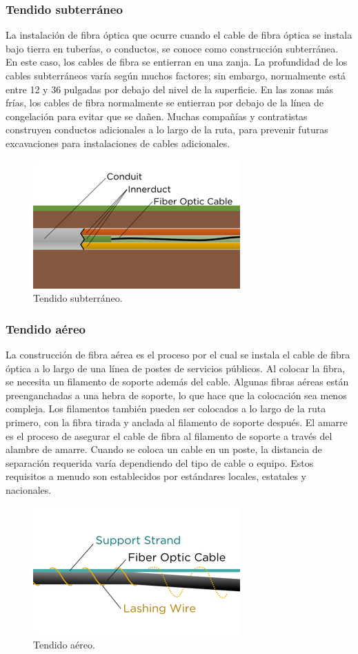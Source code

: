 \documentclass[12pt,letterpaper]{article}
\begin{document}
\subsubsection{Tendido subterráneo}
La instalación de fibra óptica que ocurre cuando el cable de fibra óptica se instala bajo 
tierra en tuberías, o conductos, se conoce como construcción subterránea. En este caso, los 
cables de fibra se entierran en una zanja. La profundidad de los cables subterráneos varía 
según muchos factores; sin embargo, normalmente está entre 12 y 36 pulgadas por debajo del 
nivel de la superficie. En las zonas más frías, los cables de fibra normalmente se entierran 
por debajo de la línea de congelación para evitar que se dañen. Muchas compañías y 
contratistas construyen conductos adicionales a lo largo de la ruta, para prevenir futuras 
excavaciones para instalaciones de cables adicionales.
\begin{figure}[ht]
    \centering
    \includegraphics[width=.5\textwidth]{f11.png}
    \caption{Tendido subterráneo.}
\end{figure}

\subsubsection{Tendido aéreo}
La construcción de fibra aérea es el proceso por el cual se instala el cable de fibra 
óptica a lo largo de una línea de postes de servicios públicos. Al colocar la fibra, se 
necesita un filamento de soporte además del cable. Algunas fibras aéreas están 
preenganchadas a una hebra de soporte, lo que hace que la colocación sea menos compleja. 
Los filamentos también pueden ser colocados a lo largo de la ruta primero, con la fibra 
tirada y anclada al filamento de soporte después. El amarre es el proceso de asegurar el 
cable de fibra al filamento de soporte a través del alambre de amarre. Cuando se coloca 
un cable en un poste, la distancia de separación requerida varía dependiendo del tipo de 
cable o equipo. Estos requisitos a menudo son establecidos por estándares locales, 
estatales y nacionales.
\begin{figure}[ht]
    \centering
    \includegraphics[width=.5\textwidth]{f12.png}
    \caption{Tendido aéreo.}
\end{figure}
\end{document}
